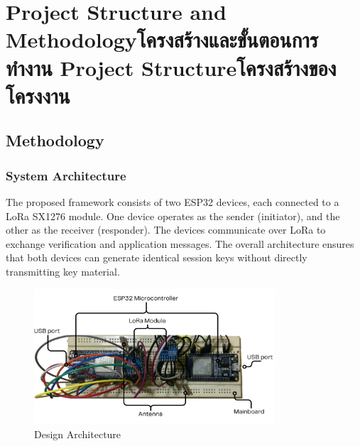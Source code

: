 \chapter{\ifproject%
\ifenglish Project Structure and Methodology\else โครงสร้างและขั้นตอนการทำงาน\fi
\else%
\ifenglish Project Structure\else โครงสร้างของโครงงาน\fi
\fi
}


\makeatletter


\makeatother

\section{Methodology}

\subsection{System Architecture}
 The proposed framework consists of two ESP32 devices, each connected to a LoRa SX1276 module. One device operates as the sender (initiator), and the other as the receiver (responder). The devices communicate over LoRa to exchange verification and application messages. The overall architecture ensures that both devices can generate identical session keys without directly transmitting key material.

\begin{figure}[htbp]
\begin{center}
\includegraphics[width=0.8\textwidth]{Architecture.jpg}
\end{center}
\caption[Picture]{Design Architecture}
\label{fig:architecture}
\end{figure}

